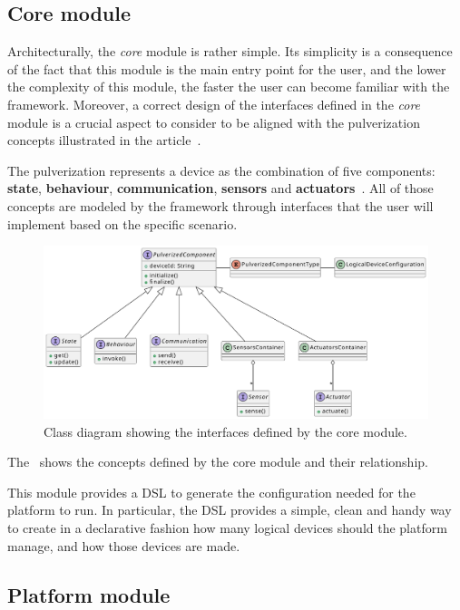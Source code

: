 \subsection{Core module}
\label{sec:core-module}

Architecturally, the \emph{core} module is rather simple. Its simplicity is a consequence of the fact that this module is the main entry point
for the user, and the lower the complexity of this module, the faster the user can become familiar with the framework.
Moreover, a correct design of the interfaces defined in the \emph{core} module is a crucial aspect to consider to be aligned with the
pulverization concepts illustrated in the article~\cite{fi12110203}.

The pulverization represents a device as the combination of five components: \textbf{state}, \textbf{behaviour}, \textbf{communication},
\textbf{sensors} and \textbf{actuators}~\cite{fi12110203}.
All of those concepts are modeled by the framework through interfaces that the user will implement based on the specific scenario.

\begin{figure}
	\centering
	\includegraphics[width=\textwidth]{figures/core-design-interfaces.pdf}
	\caption{Class diagram showing the interfaces defined by the core module.}
	\label{fig:core-module-architecture}
\end{figure}

The~ shows the concepts defined by the core module and their relationship.

This module provides a DSL to generate the configuration needed for the platform to run. In particular, the DSL provides a simple, clean and handy
way to create in a declarative fashion how many logical devices should the platform manage, and how those devices are made.

\subsection{Platform module}
\label{sec:platform-module}


